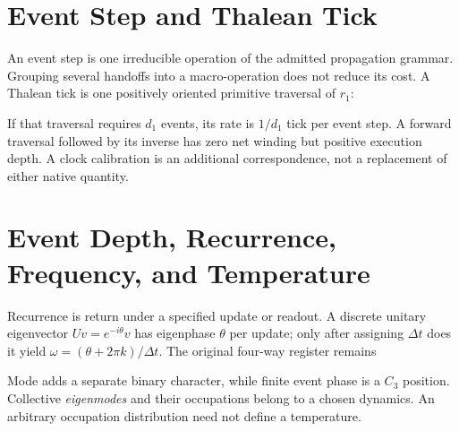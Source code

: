 \section{Event Step and Thalean Tick}\label{sec:tick}
An event step is one irreducible operation of the admitted propagation grammar. Grouping several handoffs into a macro-operation does not reduce its cost. A Thalean tick is one positively oriented primitive traversal of $r_1$:

If that traversal requires $d_1$ events, its rate is $1/d_1$ tick per event step. A forward traversal followed by its inverse has zero net winding but positive execution depth. A clock calibration is an additional correspondence, not a replacement of either native quantity.

\section{Event Depth, Recurrence, Frequency, and Temperature}
Recurrence is return under a specified update or readout. A discrete unitary eigenvector $Uv=e^{-i\theta}v$ has eigenphase $\theta$ per update; only after assigning $\Delta t$ does it yield $\omega=(\theta+2\pi k)/\Delta t$. The original four-way register remains

Mode adds a separate binary character, while finite event phase is a $C_3$ position. Collective \emph{eigenmodes} and their occupations belong to a chosen dynamics. An arbitrary occupation distribution need not define a temperature.
